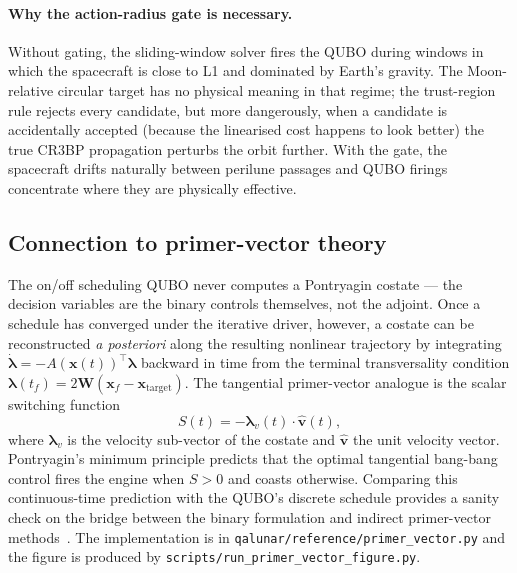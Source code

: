 \documentclass[8pt,a4paper]{article}
\newcommand{\bvec}[1]{\bm{#1}}
\newcommand{\xvec}{\bvec{x}}
\theoremstyle{definition}
\theoremstyle{remark}
\begin{document}
\paragraph{Why the action-radius gate is necessary.} Without
gating, the sliding-window solver fires the QUBO during windows in
which the spacecraft is close to L1 and dominated by Earth's
gravity. The Moon-relative circular target has no physical meaning
in that regime; the trust-region rule rejects every candidate, but
more dangerously, when a candidate is accidentally accepted
(because the linearised cost happens to look better) the true
CR3BP propagation perturbs the orbit further. With the gate, the
spacecraft drifts naturally between perilune passages and QUBO
firings concentrate where they are physically effective.

\subsection{Connection to primer-vector theory}\label{sec:primer-vector-manual}

The on/off scheduling QUBO never computes a Pontryagin costate ---
the decision variables are the binary controls themselves, not the
adjoint. Once a schedule has converged under the iterative driver,
however, a costate can be reconstructed \emph{a posteriori} along
the resulting nonlinear trajectory by integrating
$\dot{\bvec{\lambda}} = -A(\xvec(t))^\top \bvec{\lambda}$
backward in time from the terminal transversality condition
$\bvec{\lambda}(t_f) = 2\bvec{W}(\xvec_f - \xvec_\mathrm{target})$.
The tangential primer-vector analogue is the scalar switching
function
\begin{equation}\label{eq:switching-manual}
  S(t) = -\bvec{\lambda}_v(t) \cdot \hat{\bvec{v}}(t),
\end{equation}
where $\bvec{\lambda}_v$ is the velocity sub-vector of the costate
and $\hat{\bvec{v}}$ the unit velocity vector. Pontryagin's minimum
principle predicts that the optimal tangential bang-bang control
fires the engine when $S > 0$ and coasts otherwise. Comparing this
continuous-time prediction with the QUBO's discrete schedule
provides a sanity check on the bridge between the binary
formulation and indirect primer-vector
methods~\cite{Taylor2026}. The implementation is in
\texttt{qalunar/reference/primer\_vector.py} and the figure is
produced by \texttt{scripts/run\_primer\_vector\_figure.py}.
\end{document}

